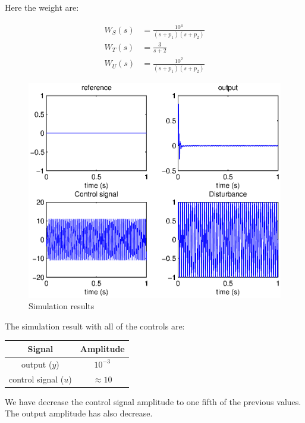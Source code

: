 \documentclass[a4paper,11pt]{article}
\begin{document}
    Here the weight are:
	
    \begin{align*}
        W_S(s) &= \frac{10^{4}}{(s+p_1)(s+p_2)}  \\
        W_T(s) &= \frac{3}{s+2} \\
        W_U(s) &= \frac{10^{2}}{(s+p_1)(s+p_2)}  
	\end{align*}

    \begin{figure}[h!b]
        \centering
        \includegraphics[width=.75\columnwidth]{fig/figure3.eps}
        \caption{Simulation results}
    \end{figure}

    The simulation result with all of the controls are:
    \begin{center}
        \begin{tabular}{|c|c|}
        \hline
        \textbf{Signal} & \textbf{Amplitude} \\
        \hline
        output ($y$) & $10^{-3}$ \\
        \hline
        control signal ($u$) & $\approx 10$ \\
        \hline
        \end{tabular}
    \end{center}

    We have decrease the control signal amplitude to one fifth of the previous values. The output amplitude has also decrease. 
\end{document}
